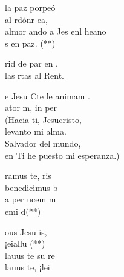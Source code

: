 \documentclass[12pt]{article}
\begin{document}
\begin{multicols*}{2}
\begin{cancion}%
	la paz porpeó\\
	al rdónr ea,\\
	almor ando a Jes enl heano\\
	s en paz. (**)\\
\end{cancion}%

\begin{cancion}%
	rid de par en ,\\
	las rtas al Rent.\\
\end{cancion}%

\begin{cancion}%
	e Jesu Cte le animam .\\
	ator m, in per\\
(Hacia ti, Jesucristo, \\
 levanto mi alma.\\
 Salvador del mundo, \\
 en Ti he puesto mi esperanza.)\\
\end{cancion}%

\begin{cancion}%
	ramus te, ris\\
	benedicimus b\\
	a per ucem m\\
	emi d(**)\\
\end{cancion}%

\begin{cancion}%
	ous Jesu is,\\
	¡eiallu (**)\\
\jump
	lauus te su re\\
	 lauus te, ¡lei \\
\end{cancion}%


\end{multicols*}
\end{document}
